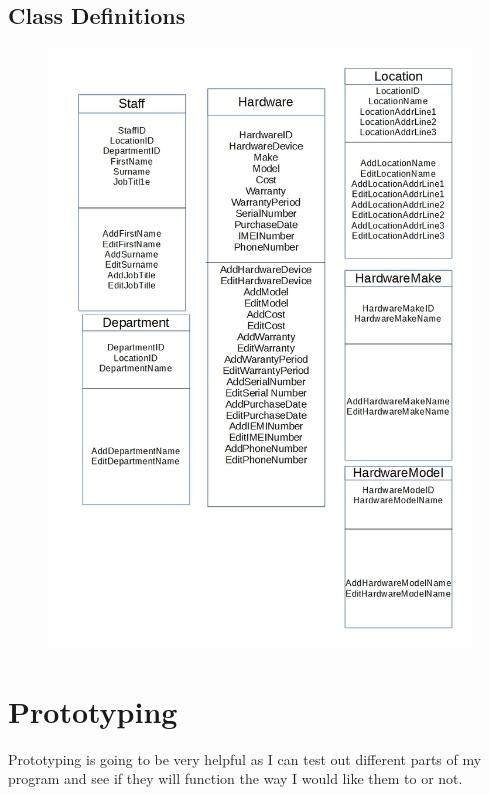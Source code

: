 \subsection{Class Definitions}

\begin{figure}[H]
\hspace*{-1.3cm}
\vspace*{-1cm}
\includegraphics[width=1\textwidth]{ClassDefinitonsDesign.jpg}
\caption{} \label{Class Definitions}
\end{figure}

\section{Prototyping}

Prototyping is going to be very helpful as I can test out different parts of my program and see if they will function the way I would like them to or not.

